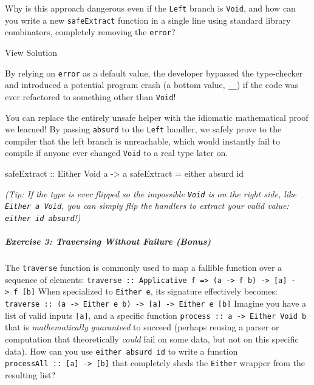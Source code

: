 \documentclass[
]{article}
\newenvironment{Shaded}{}{}
\newcommand{\DataTypeTok}[1]{\textcolor[rgb]{0.56,0.13,0.00}{#1}}
\newcommand{\FunctionTok}[1]{\textcolor[rgb]{0.02,0.16,0.49}{#1}}
\newcommand{\NormalTok}[1]{#1}
\newcommand{\OtherTok}[1]{\textcolor[rgb]{0.00,0.44,0.13}{#1}}
\begin{document}
Why is this approach dangerous even if the \texttt{Left} branch is
\texttt{Void}, and how can you write a new \texttt{safeExtract} function
in a single line using standard library combinators, completely removing
the \texttt{error}?

View Solution

By relying on \texttt{error} as a default value, the developer bypassed
the type-checker and introduced a potential program crash (a bottom
value, \texttt{\_\textbar{}\_}) if the code was ever refactored to
something other than \texttt{Void}!

You can replace the entirely unsafe helper with the idiomatic
mathematical proof we learned! By passing \texttt{absurd} to the
\texttt{Left} handler, we safely prove to the compiler that the left
branch is unreachable, which would instantly fail to compile if anyone
ever changed \texttt{Void} to a real type later on.

\begin{Shaded}
\begin{Highlighting}[]
\OtherTok{safeExtract ::} \DataTypeTok{Either} \DataTypeTok{Void}\NormalTok{ a }\OtherTok{{-}\textgreater{}}\NormalTok{ a}
\NormalTok{safeExtract }\OtherTok{=} \FunctionTok{either}\NormalTok{ absurd }\FunctionTok{id}
\end{Highlighting}
\end{Shaded}

\emph{(Tip: If the type is ever flipped so the impossible \texttt{Void}
is on the right side, like \texttt{Either\ a\ Void}, you can simply flip
the handlers to extract your valid value: \texttt{either\ id\ absurd}!)}

\subparagraph{Exercise 3: Traversing Without Failure
(Bonus)}\label{exercise-3-traversing-without-failure-bonus}

The \texttt{traverse} function is commonly used to map a fallible
function over a sequence of elements:
\texttt{traverse\ ::\ Applicative\ f\ =\textgreater{}\ (a\ -\textgreater{}\ f\ b)\ -\textgreater{}\ {[}a{]}\ -\textgreater{}\ f\ {[}b{]}}
When specialized to \texttt{Either\ e}, its signature effectively
becomes:
\texttt{traverse\ ::\ (a\ -\textgreater{}\ Either\ e\ b)\ -\textgreater{}\ {[}a{]}\ -\textgreater{}\ Either\ e\ {[}b{]}}
Imagine you have a list of valid inputs \texttt{{[}a{]}}, and a specific
function \texttt{process\ ::\ a\ -\textgreater{}\ Either\ Void\ b} that
is \emph{mathematically guaranteed} to succeed (perhaps reusing a parser
or computation that theoretically \emph{could} fail on some data, but
not on this specific data). How can you use \texttt{either\ absurd\ id}
to write a function
\texttt{processAll\ ::\ {[}a{]}\ -\textgreater{}\ {[}b{]}} that
completely sheds the \texttt{Either} wrapper from the resulting list?
\end{document}
